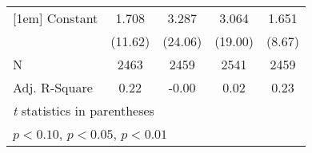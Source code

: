{\begin{tabular}{l*{4}{c}}
[1em]
Constant            &       1.708\sym{***}&       3.287\sym{***}&       3.064\sym{***}&       1.651\sym{***}\\
                    &     (11.62)         &     (24.06)         &     (19.00)         &      (8.67)         \\
\hline
N                   &        2463         &        2459         &        2541         &        2459         \\
Adj. R-Square       &        0.22         &       -0.00         &        0.02         &        0.23         \\
\hline\hline
\multicolumn{5}{l}{\footnotesize \textit{t} statistics in parentheses}\\
\multicolumn{5}{l}{\footnotesize \sym{*} \(p<0.10\), \sym{**} \(p<0.05\), \sym{***} \(p<0.01\)}\\
\end{tabular}
}
